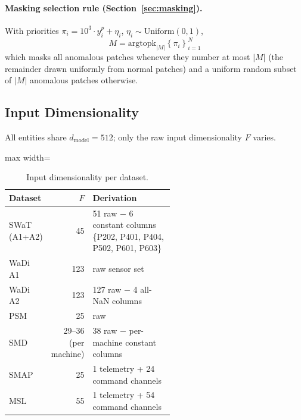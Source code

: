\paragraph{Masking selection rule (Section~\ref{sec:masking}).}
With priorities $\pi_i = 10^3 \cdot y^p_i + \eta_i$,
$\eta_i \sim \mathrm{Uniform}(0,1)$,
\begin{equation}
  M = \mathrm{argtopk}_{|M|}\!\left\{\pi_i\right\}_{i=1}^{N}
  \label{eq:masking_rule}
\end{equation}
which masks all anomalous patches whenever they number at most $|M|$ (the remainder drawn
uniformly from normal patches) and a uniform random subset of $|M|$ anomalous patches otherwise.

\subsection{Input Dimensionality}
\label{sec:appendix_dimensionality}

All entities share $d_{\mathrm{model}} = 512$; only the raw input dimensionality $F$ varies.

\begin{table}[tp]
\footnotesize
\centering
\caption{Input dimensionality per dataset.}
\label{tab:dimensionality}
\begin{adjustbox}{max width=\linewidth}
\begin{tabular}{lrp{0.55\linewidth}}
\toprule
Dataset & $F$ & Derivation \\
\midrule
SWaT (A1+A2) & 45  & 51 raw $-$ 6 constant columns \{P202, P401, P404, P502, P601, P603\} \\
WaDi A1      & 123 & raw sensor set \\
WaDi A2      & 123 & 127 raw $-$ 4 all-NaN columns \\
PSM          & 25  & raw \\
SMD          & 29--36 (per machine) & 38 raw $-$ per-machine constant columns \\
SMAP         & 25  & 1 telemetry + 24 command channels \\
MSL          & 55  & 1 telemetry + 54 command channels \\
\bottomrule
\end{tabular}
\end{adjustbox}
\end{table}

